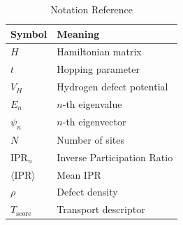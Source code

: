 \documentclass[11pt,a4paper]{article}
\begin{document}
\begin{table}[h]
\centering
\caption{Notation Reference}
\begin{tabular}{l l}
\toprule
Symbol & Meaning \\
\midrule
$H$ & Hamiltonian matrix \\
$t$ & Hopping parameter \\
$V_H$ & Hydrogen defect potential \\
$E_n$ & $n$-th eigenvalue \\
$\psi_n$ & $n$-th eigenvector \\
$N$ & Number of sites \\
$\text{IPR}_n$ & Inverse Participation Ratio \\
$\langle \text{IPR} \rangle$ & Mean IPR \\
$\rho$ & Defect density \\
$T_{\text{score}}$ & Transport descriptor \\
\bottomrule
\end{tabular}
\end{table}
\end{document}
